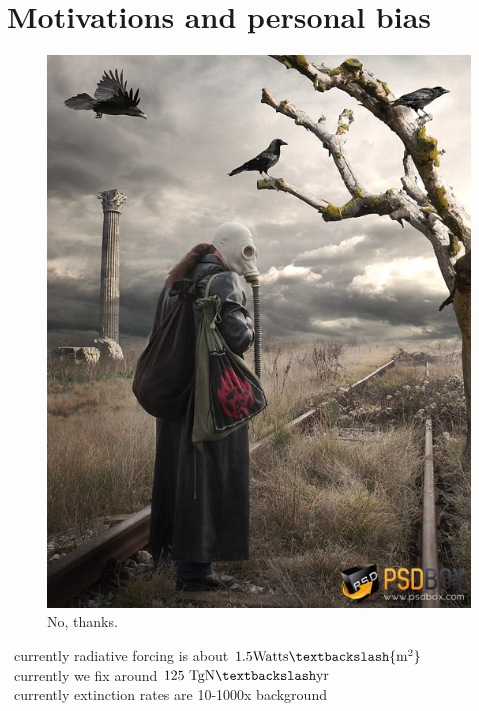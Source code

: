 \documentclass[
paper=128mm:96mm, %
fontsize=11pt, %
pagesize, %
parskip=half-, %
]{scrartcl} %
\theoremstyle{mythmstyle} %
\begin{document}
\clearpage
\section{Motivations and personal bias}
\begin{figure}
\centering
\includegraphics[height=0.95\textwidth]{Image2.jpg}
\caption{No, thanks.}
\end{figure}
\footnotesize 
\textasteriskcentered \ currently radiative forcing is about $1.5 \mathrm{Watts\textbackslash{m^2}}$\\
\textasteriskcentered \ currently we fix around $125 \ \mathrm{Tg N \textbackslash yr}$\\
\textasteriskcentered \ currently extinction rates are 10-1000x background\\

\clearpage
\end{document}
